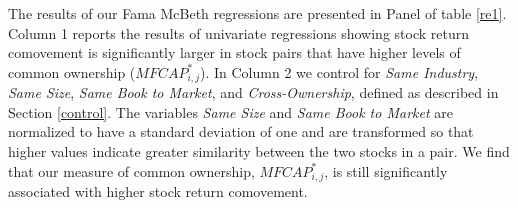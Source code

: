 	
The results of our Fama McBeth regressions are presented in Panel  of table \ref{re1}.
Column 1 reports the results of univariate regressions showing stock return comovement is significantly larger in stock pairs that have higher levels of common ownership ($ MFCAP^*_{i,j}$). 
 In Column 2 we control for  \textit{Same Industry}, \textit{Same Size}, \textit{Same Book to Market}, and \textit{Cross-Ownership}, defined as described in Section \ref{control}. The variables \textit{Same Size} and \textit{Same Book to Market} are normalized to have a standard deviation of one and are transformed so that higher values indicate greater similarity between the two stocks in a pair. We find that our measure of common ownership, $ MFCAP^*_{i,j}$, is still significantly associated with higher stock return comovement. 
		
